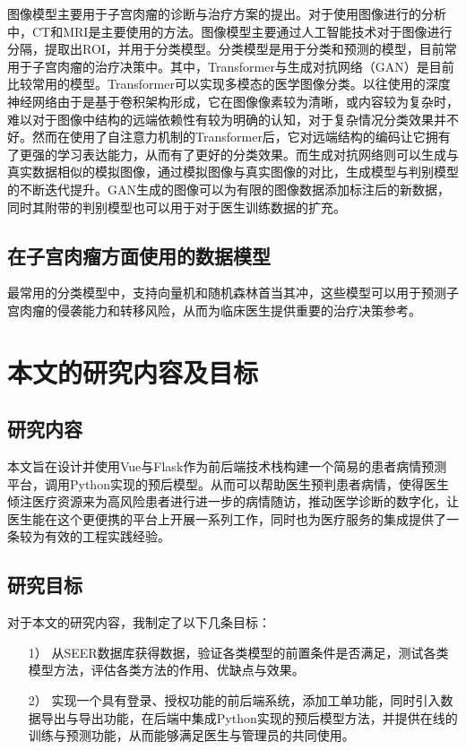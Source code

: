 图像模型主要用于子宫肉瘤的诊断与治疗方案的提出。对于使用图像进行的分析中，CT和MRI是主要使用的方法。图像模型主要通过人工智能技术对于图像进行分隔，提取出ROI，并用于分类模型。分类模型是用于分类和预测的模型，目前常用于子宫肉瘤的治疗决策中。其中，Transformer与生成对抗网络（GAN）是目前比较常用的模型。Transformer可以实现多模态的医学图像分类。以往使用的深度神经网络由于是基于卷积架构形成，它在图像像素较为清晰，或内容较为复杂时，难以对于图像中结构的远端依赖性有较为明确的认知，对于复杂情况分类效果并不好。然而在使用了自注意力机制的Transformer后，它对远端结构的编码让它拥有了更强的学习表达能力，从而有了更好的分类效果。而生成对抗网络则可以生成与真实数据相似的模拟图像，通过模拟图像与真实图像的对比，生成模型与判别模型的不断迭代提升。GAN生成的图像可以为有限的图像数据添加标注后的新数据，同时其附带的判别模型也可以用于对于医生训练数据的扩充。

\subsection{在子宫肉瘤方面使用的数据模型}

最常用的分类模型中，支持向量机和随机森林首当其冲，这些模型可以用于预测子宫肉瘤的侵袭能力和转移风险，从而为临床医生提供重要的治疗决策参考。

\section{本文的研究内容及目标}

\subsection{研究内容}

本文旨在设计并使用Vue与Flask作为前后端技术栈构建一个简易的患者病情预测平台，调用Python实现的预后模型。从而可以帮助医生预判患者病情，使得医生倾注医疗资源来为高风险患者进行进一步的病情随访，推动医学诊断的数字化，让医生能在这个更便携的平台上开展一系列工作，同时也为医疗服务的集成提供了一条较为有效的工程实践经验。

\subsection{研究目标}

对于本文的研究内容，我制定了以下几条目标：
\begin{enumerate}
    \item [1）] 从SEER数据库获得数据，验证各类模型的前置条件是否满足，测试各类模型方法，评估各类方法的作用、优缺点与效果。
    \item [2）] 实现一个具有登录、授权功能的前后端系统，添加工单功能，同时引入数据导出与导出功能，在后端中集成Python实现的预后模型方法，并提供在线的训练与预测功能，从而能够满足医生与管理员的共同使用。
\end{enumerate}


